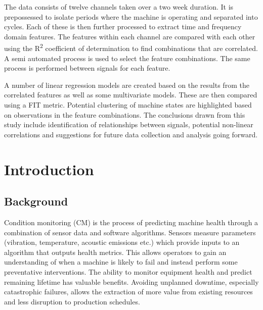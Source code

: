 \documentclass[]{article}
\begin{document}
The data consists of twelve channels taken over a two week duration. It is prepossessed to isolate periods where the machine is operating and separated into cycles. Each of these is then further processed to extract time and frequency domain features. The features within each channel are compared with each other using the R\textsuperscript{2} coefficient of determination to find combinations that are correlated. A semi automated process is used to select the feature combinations. The same process is performed between signals for each feature. 

A number of linear regression models are created based on the results from the correlated features as well as some multivariate models. These are then compared using a FIT metric. Potential clustering of machine states are highlighted based on observations in the feature combinations. The conclusions drawn from this study include identification of relationships between signals, potential non-linear correlations and suggestions for future data collection and analysis going forward.
\clearpage

\setcounter{tocdepth}{3}
\tableofcontents
\newpage

\listoffigures
\listoftables
\newpage

\printnoidxglossary[type=\acronymtype, style=list, nogroupskip=true]
\newpage


\section{Introduction}
\subsection{Background}
Condition monitoring (\gls{CM}) is the process of predicting machine health through a combination of sensor data and software algorithms. Sensors measure parameters (vibration, temperature, acoustic emissions etc.) which provide inputs to an algorithm that outputs health metrics. This allows operators to gain an understanding of when a machine is likely to fail and instead perform some preventative interventions. The ability to monitor equipment health and predict remaining lifetime has valuable benefits. Avoiding unplanned downtime, especially catastrophic failures, allows the extraction of more value from existing resources and less disruption to production schedules.
\end{document}
